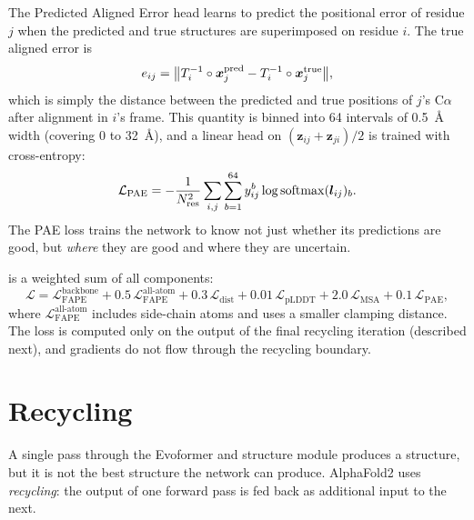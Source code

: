 The Predicted Aligned Error head learns to predict the positional error of residue $j$ when the predicted and true structures are superimposed on residue $i$.
The true aligned error is
\begin{equation}
\label{eq:aligned-error}
e_{ij} = \bigl\| T_i^{-1} \circ \bm{x}_j^\text{pred} - T_i^{-1} \circ \bm{x}_j^\text{true} \bigr\|,
\end{equation}
which is simply the distance between the predicted and true positions of $j$'s C$\alpha$ after alignment in $i$'s frame.
This quantity is binned into 64 intervals of 0.5~\AA{} width (covering 0 to 32~\AA{}), and a linear head on $(\bm{z}_{ij} + \bm{z}_{ji})/2$ is trained with cross-entropy:
\begin{equation}
\label{eq:pae-loss}
\mathcal{L}_\text{PAE} = -\frac{1}{N_\text{res}^2} \sum_{i,j} \sum_{b=1}^{64} y_{ij}^b \log \operatorname{softmax}(\bm{l}_{ij})_b.
\end{equation}
The PAE loss trains the network to know not just whether its predictions are good, but \emph{where} they are good and where they are uncertain.

 is a weighted sum of all components:
\begin{equation}
\label{eq:total-loss}
\mathcal{L} = \mathcal{L}_\text{FAPE}^\text{backbone} + 0.5\,\mathcal{L}_\text{FAPE}^\text{all-atom} + 0.3\,\mathcal{L}_\text{dist} + 0.01\,\mathcal{L}_\text{pLDDT} + 2.0\,\mathcal{L}_\text{MSA} + 0.1\,\mathcal{L}_\text{PAE},
\end{equation}
where $\mathcal{L}_\text{FAPE}^\text{all-atom}$ includes side-chain atoms and uses a smaller clamping distance.
The loss is computed only on the output of the final recycling iteration (described next), and gradients do not flow through the recycling boundary.


\section{Recycling}
\label{sec:af2-recycling}

A single pass through the Evoformer and structure module produces a structure, but it is not the best structure the network can produce.
AlphaFold2 uses \emph{recycling}: the output of one forward pass is fed back as additional input to the next.

